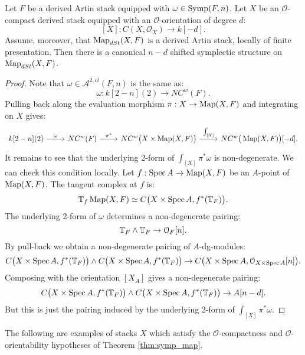 \begin{thm}
\label{thm:symp_map}
Let $F$ be a derived Artin stack equipped with $\omega \in \operatorname{Symp}(F,n)$. Let $X$ be an $\mathcal{O}$-compact derived stack
equipped with an $\mathcal{O}$-orientation of degree $d$:
\[	[X] : C(X,\mathcal{O}_X) \to k[-d].	\]
Assume, moreover, that $\operatorname{Map}_{dSt}(X,F)$ is a derived Artin stack, locally of finite presentation. Then there is a canonical
$n-d$ shifted symplectic structure on $\operatorname{Map}_{dSt}(X,F)$.
\end{thm}

\begin{proof}
Note that $\omega \in \mathcal{A}^{2,cl}(F,n)$ is the same as:
\[	\omega : k[2-n](2) \to NC^w(F) .	\]
Pulling back along the evaluation morphism $\pi : X \to \operatorname{Map}(X,F)$ and integrating on $X$ gives:
\[
\begin{tikzcd}
k[2-n](2) \arrow{r}{\omega} & NC^w(F) \arrow{r}{\pi^*} & NC^w\big(X\times \Map(X,F)\big) \arrow{r}{\int_{[X]}} &
NC^w\big(\Map(X,F)\big)[-d] .
\end{tikzcd}
\]
It remains to see that the underlying 2-form of $\int_{[X]} \pi^* \omega$ is non-degenerate. We can check
this condition locally. Let $f : \operatorname{Spec} A \to \operatorname{Map}(X,F)$ be an $A$-point of $\operatorname{Map}(X,F)$. The tangent complex at $f$ is:
\[	\mathbb T_f \operatorname{Map}(X,F) \simeq C\big(X \times \operatorname{Spec} A, f^*(\mathbb T_F)\big).	\]
The underlying 2-form of $\omega$ determines a non-degenerate pairing:
\[	\mathbb T_F \wedge \mathbb T_F \to \mathcal{O}_F[n].	\]
By pull-back we obtain a non-degenerate pairing of $A$-dg-modules:
\[	C\big(X \times \operatorname{Spec} A, f^*(\mathbb T_F)\big) \wedge C\big(X \times \operatorname{Spec} A, f^*(\mathbb T_F)\big) \to C\big(X \times \operatorname{Spec} A,
\mathcal{O}_{X\times \operatorname{Spec} A}[n]\big) .	\]
Composing with the orientation $[X_A]$ gives a non-degenerate pairing:
\[	C\big(X \times \operatorname{Spec} A, f^*(\mathbb T_F)\big) \wedge C\big(X \times \operatorname{Spec} A, f^*(\mathbb T_F)\big) \to A[n-d].	\]
But this is just the pairing induced by the underlying 2-form of $\int_{[X]} \pi^*\omega$.
\end{proof}

The following are examples of stacks $X$ which satisfy the $\mathcal{O}$-compactness and $\mathcal{O}$-orientability
hypotheses of Theorem \ref{thm:symp_map}.

